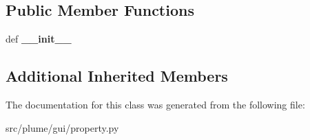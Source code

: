 \subsection*{Public Member Functions}
\begin{DoxyCompactItemize}
\item 
def {\bfseries \+\_\+\+\_\+init\+\_\+\+\_\+}\hypertarget{classplume-creator_1_1src_1_1plume_1_1gui_1_1property_1_1_sheet_property_a70342070f3d0bece1ca844f3079f1441}{}\label{classplume-creator_1_1src_1_1plume_1_1gui_1_1property_1_1_sheet_property_a70342070f3d0bece1ca844f3079f1441}

\end{DoxyCompactItemize}
\subsection*{Additional Inherited Members}


The documentation for this class was generated from the following file\+:\begin{DoxyCompactItemize}
\item 
src/plume/gui/property.\+py\end{DoxyCompactItemize}
